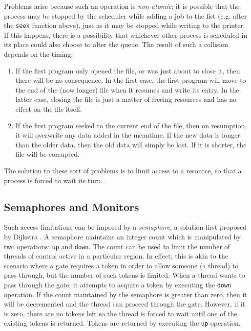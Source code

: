 Problems arise because such an operation is \emph{non-atomic}; it is
possible that the process may be stopped by the scheduler while adding
a job to the list (e.g. after the \texttt{seek} function above), just
as it may be stopped while writing to the printer.  If this happens,
there is a possibility that whichever other process is scheduled in
its place could also choose to alter the queue.  The result of such a
collision depends on the timing:

\begin{enumerate}
\item If the first program only opened the file, or was just about to
  close it, then there will be no consequence.  In the first case, the
  first program will move to the end of the (now longer) file when it
  resumes and write its entry.  In the latter case, closing the file
  is just a matter of freeing resources and has no effect on the file
  itself.
\item If the first program seeked to the current end of the file, then
  on resumption, it will overwrite any data added in the meantime.  If
  the new data is longer than the older data, then the old data will
  simply be lost.  If it is shorter, the file will be corrupted.
\end{enumerate}

The solution to these sort of problems is to limit access to a
resource, so that a process is forced to wait its turn.

\subsection{Semaphores and Monitors}
\label{semaphores}

Such access limitations can be imposed by a \emph{semaphore}, a
solution first proposed by Dijkstra \cite{semaphore}.  A semaphore
maintains an integer count which is manipulated by two operations: \texttt{up}
and \texttt{down}.  The count can be used to limit the number of threads of
control active in a particular region.  In effect, this is akin to the
scenario where a gate requires a token in order to allow someone (a
thread) to pass through, but the number of such tokens is limited.
When a thread wants to pass through the gate, it attempts to acquire a
token by executing the \texttt{down} operation.  If the count maintained by
the semaphore is greater than zero, then it will be decremented and
the thread can proceed through the gate.  However, if it is zero,
there are no tokens left so the thread is forced to wait until one of
the existing tokens is returned.  Tokens are returned by executing the
\texttt{up} operation.

